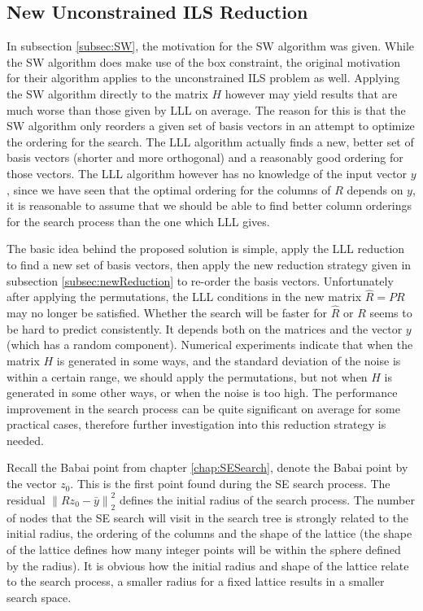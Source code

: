 \documentclass[12pt,Bold,letterpaper]{mcgilletdclass}
\begin{document}
\subsection{New Unconstrained ILS Reduction}
In subsection \ref{subsec:SW}, the motivation for the SW algorithm was given. While the SW algorithm does make use of the box constraint, the original motivation for their algorithm applies to the unconstrained ILS problem as well. Applying the SW algorithm directly to the matrix $H$ however may yield results that are much worse than those given by LLL on average. The reason for this is that the SW algorithm only reorders a given set of basis vectors in an attempt to optimize the ordering for the search. The LLL algorithm actually finds a new, better set of basis vectors (shorter and more orthogonal) and a reasonably good ordering for those vectors. The LLL algorithm however has no knowledge of the input vector $y$, since we have seen that the optimal ordering for the columns of $R$ depends on $y$, it is reasonable to assume that we should be able to find better column orderings for the search process than the one which LLL gives.

The basic idea behind the proposed solution is simple, apply the LLL reduction to find a new set of basis vectors, then apply the new reduction strategy given in subsection \ref{subsec:newReduction} to re-order the basis vectors. Unfortunately after applying the permutations, the LLL conditions in the new matrix $\hat{R} = PR$ may no longer be satisfied. Whether the search will be faster for $\hat{R}$ or $R$ seems to be hard to predict consistently. It depends both on the matrices and the vector $y$ (which has a random component). Numerical experiments indicate that when the matrix $H$ is generated in some ways, and the standard deviation of the noise is within a certain range, we should apply the permutations, but not when $H$ is generated in some other ways, or when the noise is too high. The performance improvement in the search process can be quite significant on average for some practical cases, therefore further investigation into this reduction strategy is needed.

Recall the Babai point from chapter \ref{chap:SESearch}, denote the Babai point by the vector $z_0$. This is the first point found during the SE search process. The residual $\left \| Rz_0 - \bar{y} \right \|^2_2$ defines the initial radius of the search process. The number of nodes that the SE search will visit in the search tree is strongly related to the initial radius, the ordering of the columns and the shape of the lattice (the shape of the lattice defines how many integer points will be within the sphere defined by the radius). It is obvious how the initial radius and shape of the lattice relate to the search process, a smaller radius for a fixed lattice results in a smaller search space.
\end{document}
